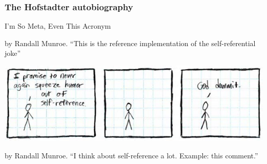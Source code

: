 \documentclass{beamer}
\begin{document}
    \begin{framefont}{\large}
        \begin{frame}
            \frametitle{The Hofstadter autobiography }

            I'm So Meta, Even This Acronym


            {\tiny by Randall Munroe.
             ``This is the reference implementation of the self-referential joke''}

            \vspace*{1cm}
            \includegraphics[width=\textwidth]{../src/png.jpg}

            {\tiny by Randall Munroe. ``I think about self-reference a lot. Example: this comment.''}
        \end{frame}
    \end{framefont}
\end{document}
